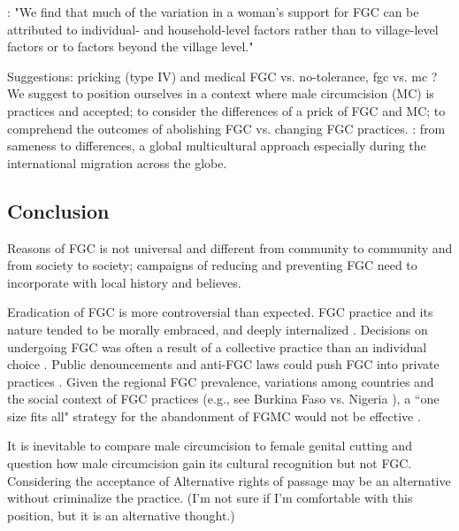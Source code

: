 \documentclass[12pt,]{article}
\begin{document}
\cite{BellNova15}: "We find that much of the variation in a woman's support for FGC can be attributed to individual- and household-level factors rather than to village-level factors or to factors beyond the village level."

Suggestions: pricking (type IV\cite{WHO08})\cite{WahlJohn17a, WahlJohn17b} and medical FGC \cite{KimaShell18} vs. no-tolerance, fgc vs. mc \cite{WahlEsse18}?  We suggest to position ourselves in a context where male circumcision (MC) is practices and accepted; to consider the differences of a prick of FGC and MC; to comprehend the outcomes of abolishing FGC vs. changing FGC practices.
\cite{WahlEsse18}:  from sameness to differences, a global multicultural approach especially during the international migration across the globe.

\subsection{Conclusion}\label{Conclusion}

Reasons of FGC is not universal and different from community to community and from society to society; campaigns of reducing and preventing FGC need to incorporate with local history and believes.

Eradication of FGC is more controversial than expected.  FGC practice and its nature tended to be morally embraced, and deeply internalized \cite{SchuLien13}.  Decisions on undergoing FGC was often a result of a collective practice than an individual choice \cite{Dell04, Hayf06, FreyJoh07, KandMwek09, Mack96, Mack06, ShelHern06, ShelWand11, YirgKass12}. Public denouncements and anti-FGC laws could push FGC into private practices \cite{GaluKama15, VanCoen17}.  Given the regional FGC prevalence, variations among countries and the social context of FGC practices (e.g., see Burkina Faso \cite{KarmKand11} vs. Nigeria \cite{KandNwak09}), a ``one size fits all" strategy for the abandonment of FGMC would not be effective \cite{JohaDiop13, YodeWang13}.

It is inevitable to compare male circumcision to female genital cutting and question how male circumcision gain its cultural recognition but not FGC.  Considering the acceptance of Alternative rights of passage \cite{GaluKama15} may be an alternative without criminalize the practice. (I'm not sure if I'm comfortable with this position, but it is an alternative thought.)
\end{document}
